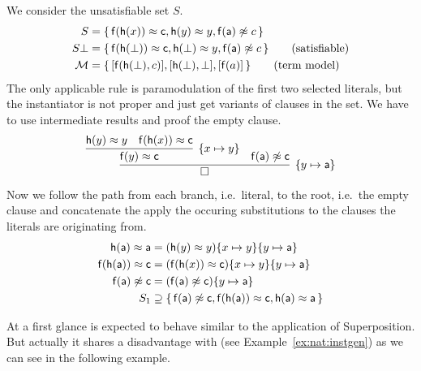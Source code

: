\newcommand{\myset}[1]{\{ \, #1 \, \}}
\newcommand{\mysub}[1]{\{ #1 \}}
\begin{example}We consider the unsatisfiable set \( S \).
	\begin{align*}
		S &= \myset{
			\mf(\mh(x)) \mEQ \mc, \mh(y)\mEQ y, \mf(\ma) \mNE c
		}
		\\
		S\bot &= \myset{
			\mf(\mh(\bot)) \mEQ \mc, \mh(\bot)\mEQ y, \mf(\ma) \mNE c
		}\tag{satisfiable}
		\\
		\mcM &= \myset{
			[\mf(\mh(\bot),c)], [\mh(\bot),\bot], [\mf(a)]
		}\tag{term model}
	\end{align*}
	The only applicable rule is paramodulation of the first two selected literals,
	but the instantiator is not proper and just get variants of clauses in the set.
	We have to use intermediate results and proof the empty clause.
	\begin{gather*}
		\infer[\mysub{y\mapsto \ma}]{\emptyclause}{
		\infer[\mysub{x\mapsto y}]
		{\mf(y)\mEQ\mc}
		{\mh(y)\mEQ y & \mf(\mh(x))\mEQ \mc}
		& \mf(\ma)\mNE\mc
		}
	\end{gather*}
	Now we follow the path from each branch, i.e.~literal, to the root, i.e.~the empty clause
	and concatenate the apply the occuring substitutions to the clauses the literals are originating from.
	\begin{align*}
		 \mh(\ma)\mEQ \ma &=
		 (\mh(y)\mEQ y)\mysub{x\mapsto y}\mysub{y\mapsto \ma}
		 \\
		 \mf(\mh(\ma))\mEQ\mc &=
		 (\mf(\mh(x))\mEQ \mc)\mysub{x\mapsto y}\mysub{y\mapsto \ma}
		 \\
		 \mf(\ma)\mNE \mc &=
		 (\mf(\ma)\mNE \mc)\mysub{y\mapsto \ma}
		 \\
		S_1 &\supseteq \myset{
			\mf(\ma) \mNE \mc,
			\mf(\mh(\ma))\mEQ \mc, \mh(\ma)\mEQ \ma
		}
	\end{align*}


\end{example}



At a first glance \InstGenEQ{} is expected to behave similar to the application of Superposition.
But actually it shares a disadvantage with \InstGen{} (see Example~\ref{ex:nat:instgen}) as we can see in the following example.


